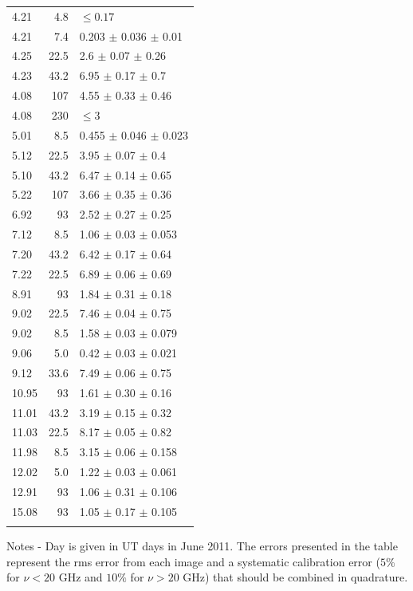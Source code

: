 \documentclass{emulateapj}
\begin{document}
\begin{table}[!ht]
\begin{center}
\begin{tabular}{lrl}
4.21 &	 4.8 &  $\leq0.17$ \\
4.21	 &    7.4	& 0.203  $\pm$ 0.036 $\pm$ 0.01\\
4.25 &	 22.5& 	 2.6	$\pm$ 0.07 $\pm$ 0.26\\
4.23 &	 43.2 &	 6.95  $\pm$  0.17 $\pm$ 0.7\\ 
4.08 &	 107	 &4.55  $\pm$  0.33 $\pm$ 0.46\\
4.08 &	 230	 & $\leq 3$       \\
5.01 &	 8.5  &  0.455  $\pm$ 0.046 $\pm$ 0.023\\ 
5.12 &	 22.5 &	 3.95   $\pm$ 0.07  $\pm$ 0.4\\
5.10 &	 43.2 &	 6.47  $\pm$  0.14  $\pm$ 0.65\\
5.22 &	 107	& 3.66  $\pm$  0.35 $\pm$ 0.36 \\
6.92	 &93	& 2.52 $\pm$	 0.27 $\pm$ 0.25\\
7.12	 &8.5	& 1.06 $\pm$	 0.03 $\pm$ 0.053\\
7.20	 &43.2	& 6.42 $\pm$	 0.17 $\pm$ 0.64 \\
7.22	 &22.5	& 6.89 $\pm$	 0.06 $\pm$ 0.69\\
8.91	 &93	& 1.84 $\pm$ 0.31 $\pm$ 0.18\\
9.02   &  22.5 &  7.46 $\pm$    0.04  $\pm$ 0.75\\
9.02     &8.5 &   1.58    $\pm$  0.03 $\pm$ 0.079\\
9.06     &5.0  &  0.42   $\pm$ 0.03 $\pm$ 0.021\\
9.12	 &33.6	& 7.49 $\pm$	 0.06 $\pm$ 0.75\\
10.95 &   93     & 1.61 $\pm$  0.30 $\pm$ 0.16\\
11.01   & 43.2 &  3.19 $\pm$  0.15 $\pm$ 0.32\\
11.03   & 22.5  & 8.17   $\pm$  0.05 $\pm$ 0.82\\
11.98  &  8.5   & 3.15   $\pm$ 0.06 $\pm$ 0.158\\
12.02  &  5.0   & 1.22 $\pm$   0.03 $\pm$ 0.061\\
12.91  &  93     & 1.06  $\pm$  0.31 $\pm$ 0.106\\
15.08  &  93  &  1.05  $\pm$  0.17 $\pm$ 0.105 \\

\noalign{\smallskip}
\hline
\smallskip
\end{tabular} 
\label{tab:RadioLog}
\end{center}
{\small
Notes - Day is given in UT days in June
2011. The errors presented in the table represent the rms error from
each image and a systematic calibration error ($5\%$ for $\nu<20$ GHz
and $10\%$ for $\nu>20$ GHz) that should be combined in quadrature.}     
\end{table}
\end{document}
